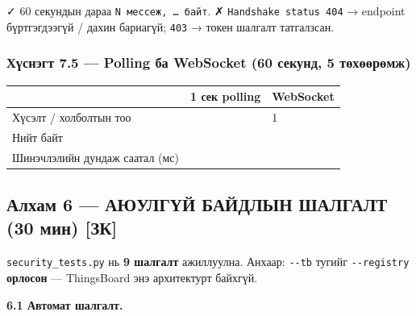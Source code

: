 ✓ 60 секундын дараа \texttt{N\ мессеж,\ \ldots{}\ байт}. ✗ \texttt{Handshake\ status\ 404} → endpoint бүртгэгдээгүй / дахин бариагүй; \texttt{403} → токен шалгалт татгалзсан.

\hypertarget{ux445ux4afux441ux43dux44dux433ux442-7.5-polling-ux431ux430-websocket-60-ux441ux435ux43aux443ux43dux434-5-ux442ux4e9ux445ux4e9ux4e9ux440ux4e9ux43cux436}{%
\subsubsection{Хүснэгт 7.5 --- Polling ба WebSocket (60 секунд, 5 төхөөрөмж)}\label{ux445ux4afux441ux43dux44dux433ux442-7.5-polling-ux431ux430-websocket-60-ux441ux435ux43aux443ux43dux434-5-ux442ux4e9ux445ux4e9ux4e9ux440ux4e9ux43cux436}}

\begingroup\scriptsize\begin{longtable}[]{@{}lll@{}}
\toprule
& 1 сек polling & WebSocket\tabularnewline
\midrule
\endhead
Хүсэлт / холболтын тоо & & 1\tabularnewline
Нийт байт & &\tabularnewline
Шинэчлэлийн дундаж саатал (мс) & &\tabularnewline
\bottomrule
\end{longtable}\endgroup

\hypertarget{ux430ux43bux445ux430ux43c-6-ux430ux44eux443ux43bux433ux4afux439-ux431ux430ux439ux434ux43bux44bux43d-ux448ux430ux43bux433ux430ux43bux442-30-ux43cux438ux43d-ux437ux43a}{%
\subsection{Алхам 6 --- АЮУЛГҮЙ БАЙДЛЫН ШАЛГАЛТ (30 мин) {[}ЗК{]}}\label{ux430ux43bux445ux430ux43c-6-ux430ux44eux443ux43bux433ux4afux439-ux431ux430ux439ux434ux43bux44bux43d-ux448ux430ux43bux433ux430ux43bux442-30-ux43cux438ux43d-ux437ux43a}}

\texttt{security\_\allowbreak{}tests.\allowbreak{}py} нь \textbf{9 шалгалт} ажиллуулна. Анхаар: \texttt{-\/-tb} тугийг \texttt{-\/-registry} \textbf{орлосон} --- ThingsBoard энэ архитектурт байхгүй.

\textbf{6.1 Автомат шалгалт.}

\begin{Shaded}
\begin{Highlighting}[]
\KeywordTok{\textbackslash{}}
    \KeywordTok{\textbackslash{}}
    \KeywordTok{|} 
\end{Highlighting}
\end{Shaded}

